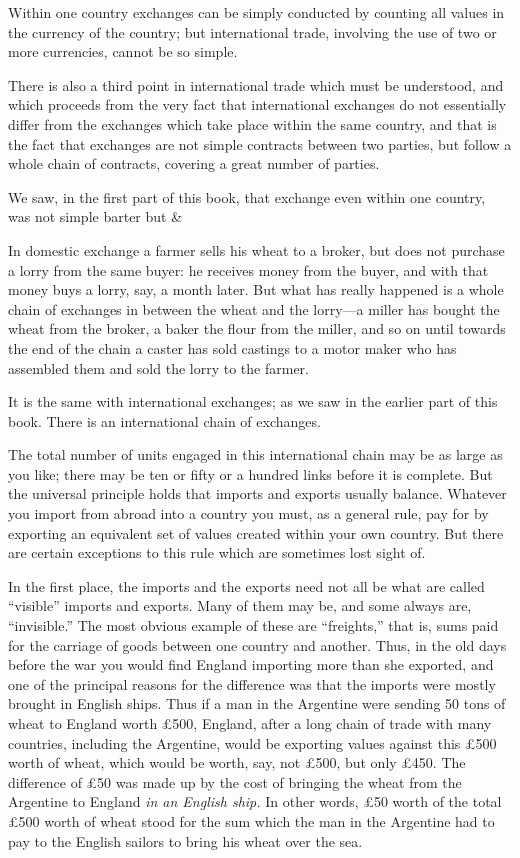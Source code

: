 \documentclass{book}
\begin{document}
Within one country exchanges can be simply conducted by counting all values in the currency of the country; but international trade, involving the use of two or more currencies, cannot be so simple.

There is also a third point in international trade which must be understood, and which proceeds from the very fact that international exchanges do not essentially differ from the exchanges which take place within the same country, and that is the fact that exchanges are not simple contracts between two parties, but follow a whole chain of contracts, covering a great number of parties.

We saw, in the first part of this book, that exchange even within one country, was not simple barter but \&

In domestic exchange a farmer sells his wheat to a broker, but does not purchase a lorry from the same buyer: he receives money from the buyer, and with that money buys a lorry, say, a month later. But what has really happened is a whole chain of exchanges in between the wheat and the lorry—a miller has bought the wheat from the broker, a baker the flour from the miller, and so on until towards the end of the chain a caster has sold castings to a motor maker who has assembled them and sold the lorry to the farmer.

It is the same with international exchanges; as we saw in the earlier part of this book. There is an international chain of exchanges.

The total number of units engaged in this international chain may be as large as you like; there may be ten or fifty or a hundred links before it is complete. But the universal principle holds that imports and exports usually balance. Whatever you import from abroad into a country you must, as a general rule, pay for by exporting an equivalent set of values created within your own country. But there are certain exceptions to this rule which are sometimes lost sight of.

In the first place, the imports and the exports need not all be what are called “visible” imports and exports. Many of them may be, and some always are, “invisible.” The most obvious example of these are “freights,” that is, sums paid for the carriage of goods between one country and another. Thus, in the old days before the war you would find England importing more than she exported, and one of the principal reasons for the difference was that the imports were mostly brought in English ships. Thus if a man in the Argentine were sending 50 tons of wheat to England worth £500, England, after a long chain of trade with many countries, including the Argentine, would be exporting values against this £500 worth of wheat, which would be worth, say, not £500, but only £450. The difference of £50 was made up by the cost of bringing the wheat from the Argentine to England \emph{in an English ship.} In other words, £50 worth of the total £500 worth of wheat stood for the sum which the man in the Argentine had to pay to the English sailors to bring his wheat over the sea.
\end{document}
